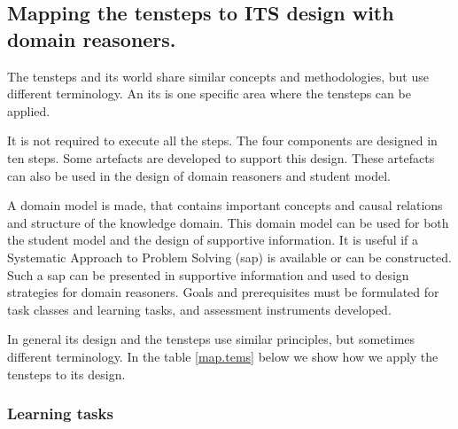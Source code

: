 \subsection{Mapping the \gls{tensteps} to ITS design with domain reasoners.}

The \gls{tensteps} and \gls{its} world share similar concepts and methodologies, but use different terminology. 
An \gls{its} is one specific area where the \gls{tensteps} can be applied.

It is not required to execute all the steps. The four components are designed in ten steps.
Some artefacts are developed to support this design. 
These artefacts can also be used in the design of domain reasoners and student model.

A domain model is made, that contains important concepts and causal relations and structure of the knowledge domain.
This domain model can be used for both the student model and the design of supportive information.
It is useful if a Systematic Approach to Problem Solving (\gls{sap}) is available or can be constructed.
Such a \gls{sap} can be presented in supportive information and used to design strategies for domain reasoners.
Goals and prerequisites must be formulated for task classes and learning tasks, and assessment instruments developed.

In general \gls{its} design and the \gls{tensteps} use similar principles, but sometimes different terminology.
In the table \ref{map.tems} below we show how we apply the \gls{tensteps} to \gls{its} design.


\subsubsection{Learning tasks} 

